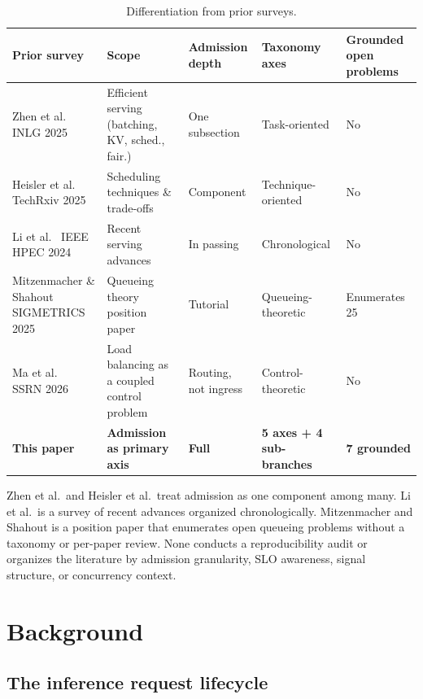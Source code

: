 \begin{table}[htbp]
\centering
\caption{Differentiation from prior surveys.}
\label{tab:diff}
\small
{}
\begin{tabular}{p{3.15cm} p{3.0cm} p{1.95cm} p{2.15cm} p{1.75cm}}
\toprule
\rowcolor{admitteallight}
\textbf{Prior survey} & \textbf{Scope} & \textbf{Admission depth} & \textbf{Taxonomy axes} & \textbf{Grounded open problems} \\
\midrule
Zhen et al.\ \citep{zhen2025titans} INLG 2025 & Efficient serving (batching, KV, sched., fair.) & One subsection & Task-oriented & No \\
Heisler et al.\ \citep{heisler2025survey} TechRxiv 2025 & Scheduling techniques \& trade-offs & Component & Technique-oriented & No \\
Li et al.\ \citep{li2024surveyllm} IEEE HPEC 2024 & Recent serving advances & In passing & Chronological & No \\
Mitzenmacher \& Shahout \citep{mitzenmacher2025queueing} SIGMETRICS 2025 & Queueing theory position paper & Tutorial & Queueing-theoretic & Enumerates 25 \\
Ma et al.\ \citep{ma2026loadbalancing} SSRN 2026 & Load balancing as a coupled control problem & Routing, not ingress & Control-theoretic & No \\
\rowcolor{admitgreylight}
\textbf{This paper} & \textbf{Admission as primary axis} & \textbf{Full} & \textbf{5 axes + 4 sub-branches} & \textbf{7 grounded} \\
\bottomrule
\end{tabular}
\end{table}

Zhen et al.\ and Heisler et al.\ treat admission as one component among
many. Li et al.\ is a survey of recent advances organized
chronologically. Mitzenmacher and Shahout is a position paper that
enumerates open queueing problems without a taxonomy or per-paper
review. None conducts a reproducibility audit or organizes the
literature by admission granularity, SLO awareness, signal structure,
or concurrency context.

\section{Background}
\label{sec:bg}

\subsection{The inference request lifecycle}

